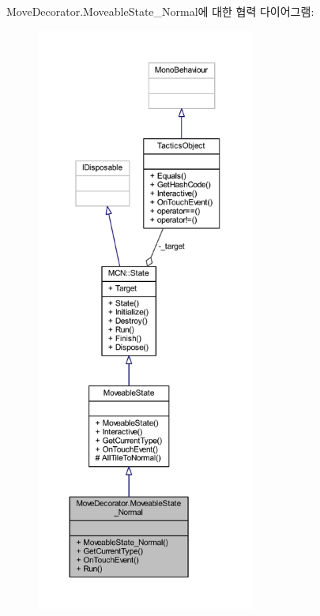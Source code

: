 Move\+Decorator.\+Moveable\+State\+\_\+\+Normal에 대한 협력 다이어그램\+:
\nopagebreak
\begin{figure}[H]
\begin{center}
\leavevmode
\includegraphics[height=550pt]{class_move_decorator_1_1_moveable_state___normal__coll__graph}
\end{center}
\end{figure}
